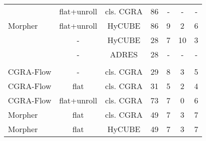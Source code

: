 \begin{table}
{\begin{tabular}{|l|c|c|c|c|c|c|}
 \rowcolor{darkRed!50}{Morpher}                       & {flat+unroll}                        & cls. CGRA                            & 86                            & -                          & -                                   & - \\ 
 {Morpher}                                            & {flat+unroll}                        & HyCUBE                               & 86                            & 9                          & 2                                   & 6 \\ 
 \rowcolor{darkOrange!50}{CGRA-ME}                    & {-}                                  & HyCUBE                               & 28                            & 7                          & 10                                  & 3 \\
 \rowcolor{darkRed!50}{Pillars}                       & {-}                                  & ADRES                                & 28                            & -                          & -                                   & - \\\hline\hline
 \rowcolor{darkGray} \multicolumn{7}{|c|}{\color{white}{\textbf{MVT}}} \\\hline
 {CGRA-Flow}                                          & -                                    & cls. CGRA                            & 29                            & 8                          & 3                                   & 5 \\ 
 {CGRA-Flow}                                          & flat                                 & cls. CGRA                            & 31                            & 5                          & 2                                   & 4 \\
 {CGRA-Flow}                                          & flat+unroll                          & cls. CGRA                            & 73                            & 7                          & 0                                   & 6 \\
 {Morpher}                                            & {flat}                               & cls. CGRA                            & 49                            & 7                          & 3                                   & 7 \\ 
 {Morpher}                                            & {flat}                               & HyCUBE                               & 49                            & 7                          & 3                                   & 7\\ 

\end{tabular}}
\end{table}
